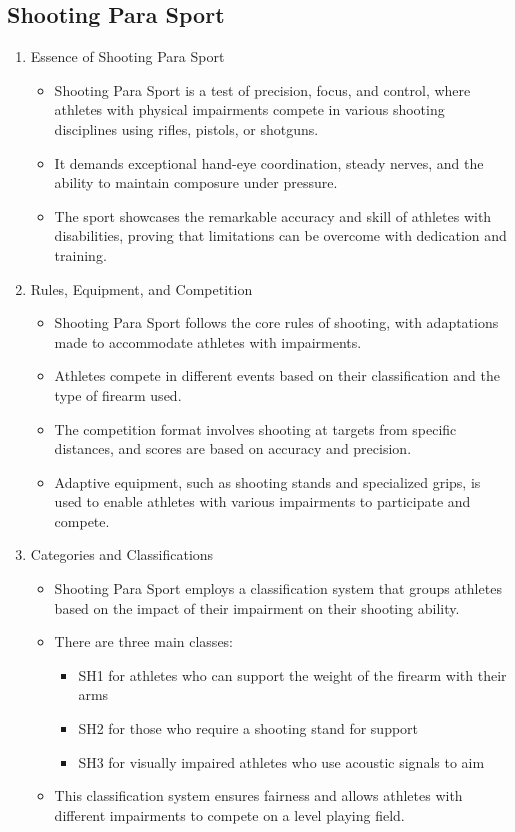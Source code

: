 \subsection{Shooting Para Sport}

\begin{enumerate}

\item Essence of Shooting Para Sport
    \begin{itemize}
    \item Shooting Para Sport is a test of precision, focus, and control, where athletes with physical impairments compete in various shooting disciplines using rifles, pistols, or shotguns. 
    \item It demands exceptional hand-eye coordination, steady nerves, and the ability to maintain composure under pressure. 
    \item The sport showcases the remarkable accuracy and skill of athletes with disabilities, proving that limitations can be overcome with dedication and training.
    \end{itemize}

\item Rules, Equipment, and Competition
    \begin{itemize}
    \item Shooting Para Sport follows the core rules of shooting, with adaptations made to accommodate athletes with impairments. 
    \item Athletes compete in different events based on their classification and the type of firearm used. 
    \item The competition format involves shooting at targets from specific distances, and scores are based on accuracy and precision. 
    \item Adaptive equipment, such as shooting stands and specialized grips, is used to enable athletes with various impairments to participate and compete.
    \end{itemize}

\item Categories and Classifications
    \begin{itemize}
    \item Shooting Para Sport employs a classification system that groups athletes based on the impact of their impairment on their shooting ability. 
    \item There are three main classes: 
        \begin{itemize}
        \item SH1 for athletes who can support the weight of the firearm with their arms
        \item SH2 for those who require a shooting stand for support
        \item SH3 for visually impaired athletes who use acoustic signals to aim
        \end{itemize}
    \item This classification system ensures fairness and allows athletes with different impairments to compete on a level playing field.
    \end{itemize}

\end{enumerate}